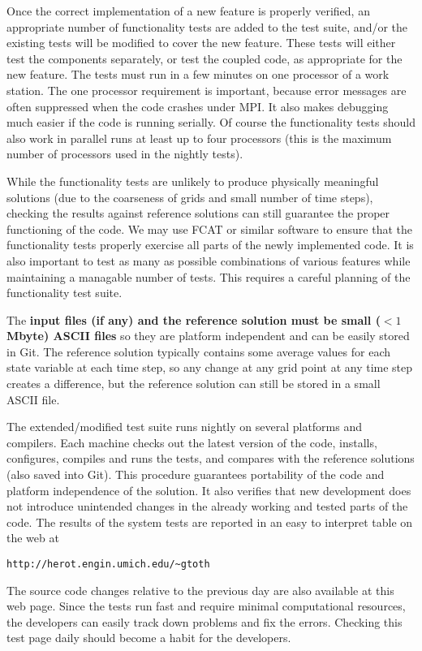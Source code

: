 \documentclass{article}
\begin{document}
Once the correct implementation of a new feature is properly verified,
an appropriate number of functionality tests are added to the test suite,
and/or the existing tests will be modified to cover the new feature.
These tests will either test the components separately, or test the coupled
code, as appropriate for the new feature.
The tests must run in a few minutes on one processor of a work station. 
The one processor requirement is important, because error messages are
often suppressed when the code crashes under MPI. It also makes 
debugging much easier if the code is running serially. Of course the
functionality tests should also work in parallel runs at least up to
four processors (this is the maximum number of processors used in the
nightly tests).

While the functionality tests are unlikely to produce physically 
meaningful solutions (due to the coarseness of grids and small number 
of time steps), checking the results against reference solutions 
can still guarantee the proper functioning of the code. 
We may use FCAT or similar software to ensure that
the functionality tests properly exercise all parts of the newly implemented
code. It is also important to test as many as possible combinations of 
various features while maintaining a managable number of tests. 
This requires a careful planning of the functionality test suite.

The {\bf input files (if any) and the reference solution must be small 
($<1$ Mbyte) ASCII files} so they are platform independent and can be 
easily stored in Git.
The reference solution typically contains some average values for each
state variable at each time step, so any change at any grid point at
any time step creates a difference, but the reference solution can 
still be stored in a small ASCII file.

The extended/modified test suite runs nightly on several platforms and 
compilers. Each machine checks out the latest version of the code, 
installs, configures, compiles and runs the tests, and compares with
the reference solutions (also saved into Git).
This procedure guarantees portability of the code and 
platform independence of the solution. It also verifies
that new development does not introduce unintended changes in the 
already working and tested parts of the code.
The results of the system tests are reported in an easy to interpret
table on the web at
\begin{verbatim}
http://herot.engin.umich.edu/~gtoth
\end{verbatim}
The source code changes relative to the previous day are 
also available at this web page.
Since the tests run fast and require minimal computational resources,
the developers can easily track down problems and fix the errors.
Checking this test page daily should become a habit for the developers.
\end{document}
